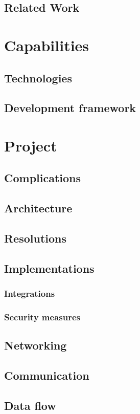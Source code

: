\documentclass[a4paper,10pt]{article}
\begin{document}
    \subsection{Related Work}
    \section{Capabilities}
    \subsection{Technologies}
    \subsection{Development framework}
    \section{Project}
    \subsection{Complications}
    \subsection{Architecture}
    \subsection{Resolutions}
    \subsection{Implementations}
    \subsubsection{Integrations}
    \subsubsection{Security measures}
    \subsection{Networking}
    \subsection{Communication}
    \subsection{Data flow}
\end{document}
